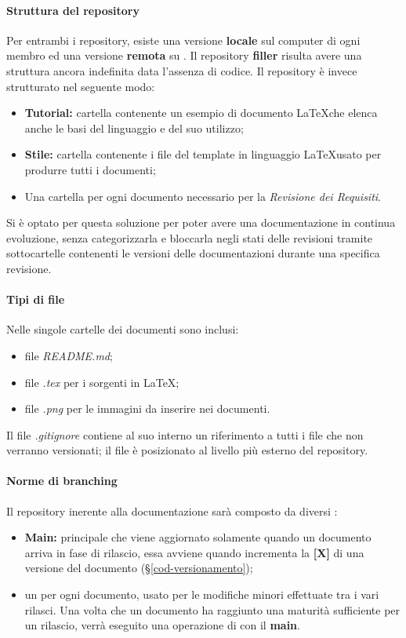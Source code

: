\paragraph{Struttura del repository}
Per entrambi i repository, esiste una versione \textbf{locale} sul computer di ogni membro ed una versione \textbf{remota} su .\newline
Il repository \textbf{filler} risulta avere una struttura ancora indefinita data l'assenza di codice.\newline
Il repository \textbf{\repoDoc} è invece strutturato nel seguente modo:
\begin{itemize}
	\item \textbf{Tutorial:} cartella contenente un esempio di documento \LaTeX che elenca anche le basi del linguaggio e del suo utilizzo; 
	\item \textbf{Stile:} cartella contenente i file del template in linguaggio \LaTeX usato per produrre tutti i documenti;
	\item Una cartella per ogni documento necessario per la \textit{Revisione dei Requisiti}.
\end{itemize}
Si è optato per questa soluzione per poter avere una documentazione in continua evoluzione, senza categorizzarla e bloccarla negli stati delle revisioni tramite sottocartelle contenenti le versioni delle documentazioni durante una specifica revisione.
\paragraph{Tipi di file}
Nelle singole cartelle dei documenti sono inclusi:
\begin{itemize}
\item file \textit{README.md};
\item file \textit{.tex} per i sorgenti in \LaTeX; 
\item file \textit{.png} per le immagini da inserire nei documenti.
\end{itemize}
Il file \textit{.gitignore} contiene al suo interno un riferimento a tutti i file che non verranno versionati; il file è posizionato al livello più esterno del repository.
\paragraph{Norme di branching}
\label{NormeBranching}
Il repository inerente alla documentazione sarà composto da diversi :
\begin{itemize}
	\item \textbf{Main:}  principale che viene aggiornato solamente quando un documento arriva in fase di rilascio, essa avviene quando incrementa la \textbf{[X]} di una versione del documento (\S{}\ref{cod-versionamento});
	\item un  per ogni documento, usato per le modifiche minori effettuate tra i vari rilasci. Una volta che un documento ha raggiunto una maturità sufficiente per un rilascio, verrà eseguito una operazione di  con il \textbf{main}.
\end{itemize}

